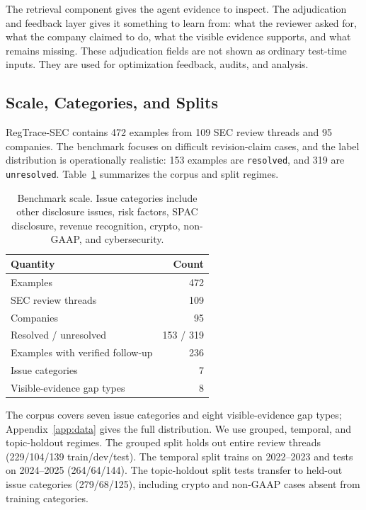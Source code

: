 \documentclass[11pt]{article}
\newcommand{\dataset}{RegTrace-SEC}
\begin{document}
The retrieval component gives the agent evidence to inspect. The adjudication and feedback layer gives it something to learn from: what the reviewer asked for, what the company claimed to do, what the visible evidence supports, and what remains missing. These adjudication fields are not shown as ordinary test-time inputs. They are used for optimization feedback, audits, and analysis.

\subsection{Scale, Categories, and Splits}

\dataset{} contains 472 examples from 109 SEC review threads and 95 companies. The benchmark focuses on difficult revision-claim cases, and the label distribution is operationally realistic: 153 examples are \texttt{resolved}, and 319 are \texttt{unresolved}. Table~\ref{tab:data} summarizes the corpus and split regimes.

\begin{table}[t]
\centering
\small
\begin{tabular}{lr}
\toprule
\textbf{Quantity} & \textbf{Count} \\
\midrule
Examples & 472 \\
SEC review threads & 109 \\
Companies & 95 \\
Resolved / unresolved & 153 / 319 \\
Examples with verified follow-up & 236 \\
\midrule
Issue categories & 7 \\
Visible-evidence gap types & 8 \\
\bottomrule
\end{tabular}
\caption{Benchmark scale. Issue categories include other disclosure issues, risk factors, SPAC disclosure, revenue recognition, crypto, non-GAAP, and cybersecurity.}
\label{tab:data}
\end{table}

The corpus covers seven issue categories and eight visible-evidence gap types; Appendix~\ref{app:data} gives the full distribution. We use grouped, temporal, and topic-holdout regimes. The grouped split holds out entire review threads (229/104/139 train/dev/test). The temporal split trains on 2022--2023 and tests on 2024--2025 (264/64/144). The topic-holdout split tests transfer to held-out issue categories (279/68/125), including crypto and non-GAAP cases absent from training categories.
\end{document}
